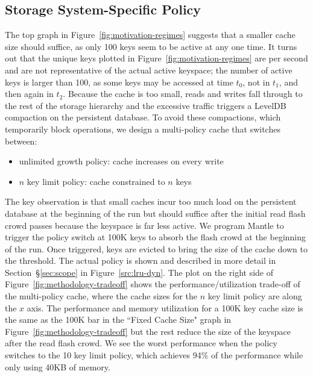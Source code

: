 %
%

\subsection{Storage System-Specific Policy}
\label{sec:arch-specific}
The top graph in Figure~\ref{fig:motivation-regimes} suggests that a
smaller cache size should suffice, as only 100 keys seem to be active at any
one time.  It turns out that the unique keys plotted in
Figure~\ref{fig:motivation-regimes} are per second and are not representative
of the actual active keyspace; the number of active keys is larger than 100, as
some keys may be accessed at time \(t_0\), not in \(t_1\), and then again in
\(t_2\). Because the cache is too small, reads and writes fall through to the
rest of the storage hierarchy and the excessive traffic triggers a LevelDB
compaction on the persistent database.  To avoid these compactions, which
temporarily block operations, we design a multi-policy cache that switches
between:

\begin{itemize}
  \item unlimited growth policy: cache increases on every write
  \item \(n\) key limit policy: cache constrained to \(n\) keys
\end{itemize}

The key observation is that small caches incur too much load on the persistent
database at the beginning of the run but should suffice after the initial read
flash crowd passes because the keyspace is far less active.  We program Mantle
to trigger the policy switch at 100K keys to absorb the flash crowd at the
beginning of the run. Once triggered, keys are evicted to bring the size of the
cache down to the threshold.  The actual policy is shown and described in more
detail in Section~\S\ref{sec:scope} in Figure~\ref{src:lru-dyn}.  The plot on
the right side of Figure~\ref{fig:methodology-tradeoff} shows the
performance/utilization trade-off of the multi-policy cache, where the cache
sizes for the \(n\) key limit policy are along the \(x\) axis.  The performance
and memory utilization for a 100K key cache size is the same as the 100K bar in
the ``Fixed Cache Size" graph in Figure~\ref{fig:methodology-tradeoff} but the
rest reduce the size of the keyspace after the read flash crowd.  We see the
worst performance when the policy switches to the 10 key limit policy, which
achieves 94\% of the performance while only using 40KB of memory. 

